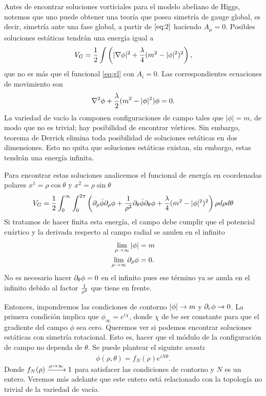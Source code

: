 Antes de encontrar soluciones vorticiales para el modelo abeliano de Higgs, notemos que uno puede obtener una teoría que posea simetría de gauge global, es decir, simetría ante una fase global, a partir de $\eqref{eq:2}$ haciendo $A_\mu=0$. Posibles soluciones estáticas tendrán una energía igual a 
\begin{align}
	V_G = \frac{1}{2}\int\left(|\nabla\phi|^2+\frac{\lambda}{4}(m^2-|\phi|^2)^2\right),
\end{align}
que no es más que el funcional \eqref{eq:gl} con $A_i=0$. Las correspondientes ecuaciones de movimiento son
\begin{align}
    \nabla^2\phi+\frac{\lambda}{2}(m^2-|\phi|^2)\phi=0. \label{eq:3}
\end{align}
La variedad de vacío la componen configuraciones de campo tales que $|\phi|=m$, de modo que no es trivial; hay posibilidad de encontrar vórtices. Sin embargo, teorema de Derrick elimina toda posibilidad de soluciones estáticas en dos dimensiones. Esto no quita que soluciones estáticas existan, sin embargo, estas tendrán una energía infinita.

Para encontrar estas soluciones analicemos el funcional de energía en coordenadas polares $x^1=\rho\cos\theta$ y $x^2=\rho\sin\theta$
\begin{align}
    V_G = \frac{1}{2}\int_0^\infty\int_0^{2\pi}\left(\partial_\rho\bar\phi\partial_\rho\phi+\frac{1}{\rho^2}\partial_\theta\bar\phi\partial_\theta\phi+\frac{\lambda}{4}(m^2-|\phi|^2)^2\right)\rho d\rho d\theta \label{eq:4}
\end{align}
Si tratamos de hacer finita esta energía, el campo debe cumplir que el potencial cuártico y la derivada respecto al campo radial se anulen en el infinito
\begin{align}
    \lim_{\rho\rightarrow\infty} |\phi| &= m \label{eq:5}\\
    \lim_{\rho\rightarrow\infty} \partial_\rho\phi &= 0 .\label{eq:6}
\end{align}
No es necesario hacer $\partial_\theta\phi=0$ en el infinito pues ese término ya se anula en el infinito debido al factor $\frac{1}{\rho^2}$ que tiene en frente.

Entonces, impondremos las condiciones de contorno $|\phi|\rightarrow m$ y $\partial_r\phi\rightarrow 0$. La primera condición implica que $\phi_\infty = e^{i\chi}$,  donde $\chi$ de be ser constante para que el gradiente del campo $\phi$ sea cero. Queremos ver si podemos encontrar soluciones estáticas con simetría rotacional. Esto es, hacer que el módulo de la configuración de campo no dependa de $\theta$. Se puede plantear el siguinte \emph{ansatz}
\begin{align}
    \phi(\rho,\theta) = f_N(\rho)e^{iN\theta}. \label{eq:7}
\end{align}
Donde $f_N(\rho)\xrightarrow{\rho\rightarrow\infty} 1$ para satisfacer las condiciones de contorno y $N$ es un entero. Veremos más adelante que este entero está relacionado con la topología no trivial de la variedad de vacío.

